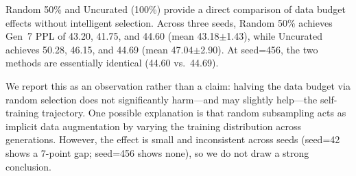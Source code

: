 Random 50\% and Uncurated (100\%) provide a direct comparison of data budget effects without intelligent selection. Across three seeds, Random 50\% achieves Gen~7 PPL of 43.20, 41.75, and 44.60 (mean 43.18$\pm$1.43), while Uncurated achieves 50.28, 46.15, and 44.69 (mean 47.04$\pm$2.90). At seed=456, the two methods are essentially identical (44.60 vs.\ 44.69).

We report this as an observation rather than a claim: halving the data budget via random selection does not significantly harm---and may slightly help---the self-training trajectory. One possible explanation is that random subsampling acts as implicit data augmentation by varying the training distribution across generations. However, the effect is small and inconsistent across seeds (seed=42 shows a 7-point gap; seed=456 shows none), so we do not draw a strong conclusion.
